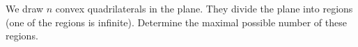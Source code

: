 We draw $n$ convex quadrilaterals in the plane. They divide the plane into regions (one of the regions is infinite). Determine the maximal possible number of these regions.